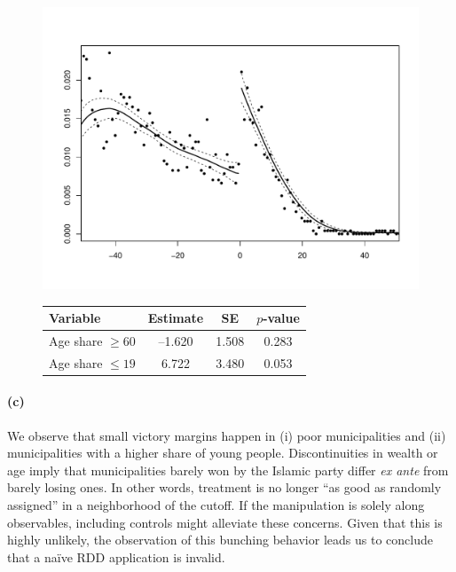 \documentclass{scrartcl}
\begin{document}
\begin{figure}
  \begin{minipage}[b]{.45\linewidth}
    \centering
    \includegraphics[width=\linewidth]{output/figures/4_density_test.pdf}
    \label{fig:threshDens}
  \end{minipage}\hfill
  \begin{minipage}[b]{.45\linewidth}
    \centering
    \label{tab:Ex2b}
    \vspace{.5em}                   %
    \begin{tabular}{lccc}
      \toprule
      Variable            & Estimate & SE    & $p$-value\\
      \midrule
      Age share $\ge 60$  & –1.620   & 1.508 & 0.283\\
      Age share $\le 19$  &  6.722   & 3.480 & 0.053\\
      \bottomrule
    \end{tabular}
  \end{minipage}
\end{figure}

\paragraph*{(c)}
We observe that small victory margins happen in (i) poor municipalities and (ii) municipalities with a higher share of young people. Discontinuities in wealth or age imply that municipalities barely won by the Islamic party differ \emph{ex ante} from barely losing ones. In other words, treatment is no longer “as good as randomly assigned” in a neighborhood of the cutoff. If the manipulation is solely along observables, including controls might alleviate these concerns. Given that this is highly unlikely, the observation of this bunching behavior leads us to conclude that a naïve RDD application is invalid. 
\end{document}
